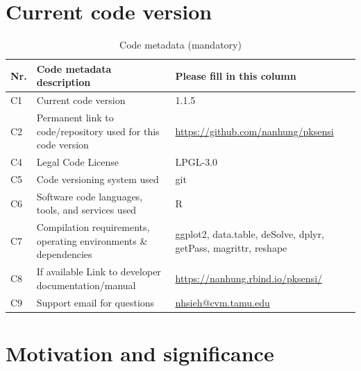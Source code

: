 \documentclass[preprint,12pt, a4paper]{elsarticle}
\begin{document}
\section*{Current code version}

\begin{table}[H]
\begin{tabular}{|l|p{6.5cm}|p{6.5cm}|}
\hline
\textbf{Nr.} & \textbf{Code metadata description} & \textbf{Please fill in this column} \\
\hline
C1 & Current code version & 1.1.5 \\
\hline
C2 & Permanent link to code/repository used for this code version & \url{https://github.com/nanhung/pksensi} \\
\hline
C4 & Legal Code License   & LPGL-3.0 \\
\hline
C5 & Code versioning system used & git \\
\hline
C6 & Software code languages, tools, and services used & R \\
\hline
C7 & Compilation requirements, operating environments \& dependencies & ggplot2, data.table, deSolve, dplyr, getPass, magrittr, reshape \\
\hline
C8 & If available Link to developer documentation/manual & \url{https://nanhung.rbind.io/pksensi/} \\
\hline
C9 & Support email for questions & \url{nhsieh@cvm.tamu.edu} \\
\hline
\end{tabular}
\caption{Code metadata (mandatory)}
\label{} 
\end{table}


\linenumbers


\newpage

\section{Motivation and significance}
\end{document}
